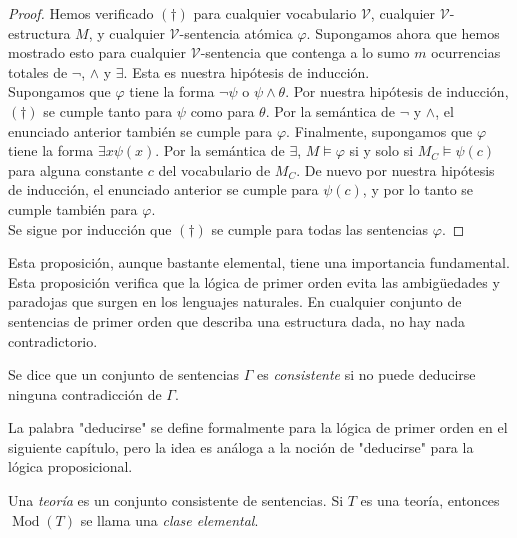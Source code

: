 \message{ !name(main.tex)}\documentclass[12pt,a4paper]{book}
\newcommand{\comillas}[1]{"#1"}
\newcommand{\VV}{\mathcal{V}}
\DeclareMathOperator{\Mod}{Mod}
\begin{document}
\begin{proof}
        Hemos verificado $(\dagger)$ para cualquier vocabulario $\VV$, cualquier $\VV$-estructura $M$, y cualquier
        $\VV$-sentencia atómica $\varphi$. Supongamos ahora que hemos mostrado esto para cualquier $\VV$-sentencia que
        contenga a lo sumo $m$ ocurrencias totales de $\neg$, $\wedge$ y $\exists$. Esta es nuestra hipótesis de
        inducción.\\
        Supongamos que $\varphi$ tiene la forma $\neg\psi$ o $\psi\wedge\theta$. Por nuestra hipótesis de inducción,
        $(\dagger)$ se cumple tanto para $\psi$ como para $\theta$. Por la semántica de $\neg$ y $\wedge$, el enunciado
        anterior también se cumple para $\varphi$. Finalmente, supongamos que $\varphi$ tiene la forma $\exists x\psi(x)$.
        Por la semántica de $\exists$, $M\models\varphi$ si y solo si $M_{C}\models\psi(c)$ para alguna constante $c$ del
        vocabulario de $M_{C}$. De nuevo por nuestra hipótesis de inducción, el enunciado anterior se cumple para
        $\psi(c)$, y por lo tanto se cumple también para $\varphi$.\\
        Se sigue por inducción que $(\dagger)$ se cumple para todas las sentencias $\varphi$.
    \end{proof}

    Esta proposición, aunque bastante elemental, tiene una importancia fundamental. Esta proposición verifica que la
    lógica de primer orden evita las ambigüedades y paradojas que surgen en los lenguajes naturales. En cualquier conjunto
    de sentencias de primer orden que describa una estructura dada, no hay nada contradictorio.

    \begin{definicion}[Consistente]\label{def:consistente}
        Se dice que un conjunto de sentencias $\Gamma$ es \textit{consistente} si no puede deducirse ninguna contradicción
        de $\Gamma$.
    \end{definicion}

    La palabra \comillas{deducirse} se define formalmente para la lógica de primer orden en el siguiente capítulo, pero la
    idea es análoga a la noción de \comillas{deducirse} para la lógica proposicional.

    \begin{definicion}[Teoría]\label{def:teoria-clase-elemental}
        Una \textit{teoría} es un conjunto consistente de sentencias. Si $T$ es una teoría, entonces $\Mod(T)$ se llama
        una \textit{clase elemental}.
    \end{definicion}
\end{document}
